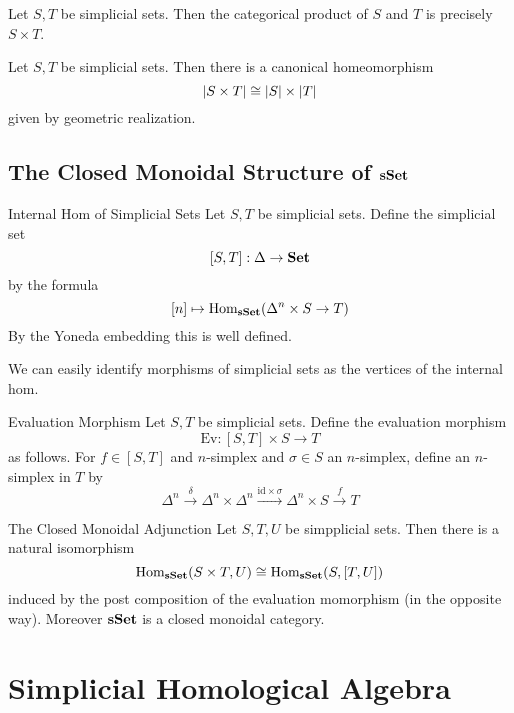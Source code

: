 \documentclass[a4paper]{article}
\begin{document}
\begin{prp}{}{} Let $S,T$ be simplicial sets. Then the categorical product of $S$ and $T$ is precisely $S\times T$. 
\end{prp}

\begin{lmm}{}{} Let $S,T$ be simplicial sets. Then there is a canonical homeomorphism $$\abs{S\times T}\cong\abs{S}\times\abs{T}$$ given by geometric realization. 
\end{lmm}

\subsection{The Closed Monoidal Structure of $\bold{sSet}$}
\begin{defn}{Internal Hom of Simplicial Sets}{} Let $S,T$ be simplicial sets. Define the simplicial set $$[S,T]:\Delta\to\bold{Set}$$ by the formula $$[n]\mapsto\operatorname{Hom}_\bold{sSet}(\Delta^n\times S\to T)$$ By the Yoneda embedding this is well defined. 
\end{defn}

We can easily identify morphisms of simplicial sets as the vertices of the internal hom. 

\begin{defn}{Evaluation Morphism}{} Let $S,T$ be simplicial sets. Define the evaluation morphism $$\text{Ev}:[S,T]\times S\to T$$ as follows. For $f\in[S,T]$ and $n$-simplex and $\sigma\in S$ an $n$-simplex, define an $n$-simplex in $T$ by $$\Delta^n\overset{\delta}{\rightarrow}\Delta^n\times\Delta^n\overset{\text{id}\times\sigma}{\rightarrow}\Delta^n\times S\overset{f}{\rightarrow}T$$
\end{defn}

\begin{thm}{The Closed Monoidal Adjunction}{} Let $S,T,U$ be simpplicial sets. Then there is a natural isomorphism $$\operatorname{Hom}_\bold{sSet}(S\times T,U)\cong\operatorname{Hom}_\bold{sSet}(S,[T,U])$$ induced by the post composition of the evaluation momorphism (in the opposite way). Moreover $\bold{sSet}$ is a closed monoidal category. 
\end{thm}

\pagebreak
\section{Simplicial Homological Algebra}
\end{document}
